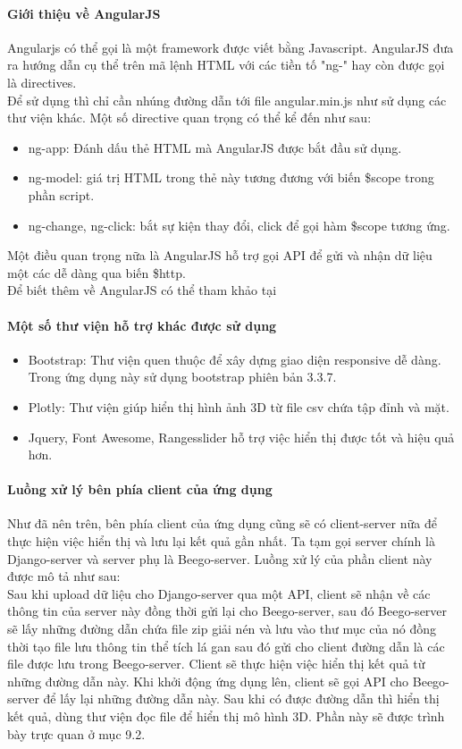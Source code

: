 \paragraph{ Giới thiệu về AngularJS\\}
Angularjs có thể gọi là một framework được viết bằng Javascript. AngularJS đưa ra hướng dẫn cụ thể trên mã lệnh HTML với các tiền tố "ng-" hay còn được gọi là directives.\\
Để sử dụng thì chỉ cần nhúng đường dẫn tới file angular.min.js như sử dụng các thư viện khác.
Một số directive quan trọng có thể kể đến như sau:
\begin{itemize}
    \item ng-app: Đánh dấu thẻ HTML mà AngularJS được bắt đầu sử dụng.
    \item ng-model: giá trị HTML trong thẻ này tương đương với biến \$scope trong phần script.
    \item ng-change, ng-click: bắt sự kiện thay đổi, click để gọi hàm \$scope tương ứng.
\end{itemize}
Một điều quan trọng nữa là AngularJS hỗ trợ gọi API để gửi và nhận dữ liệu một các dễ dàng qua biến \$http.\\
Để biết thêm về AngularJS có thể tham khảo tại 

\paragraph{Một số thư viện hỗ trợ khác được sử dụng\\}
\begin{itemize}
    \item Bootstrap: Thư viện quen thuộc để xây dựng giao diện responsive dễ dàng. Trong ứng dụng này sử dụng bootstrap phiên bản 3.3.7.
    \item Plotly: Thư viện giúp hiển thị hình ảnh 3D từ file csv chứa tập đỉnh và mặt.
    \item Jquery, Font Awesome, Rangesslider hỗ trợ việc hiển thị được tốt và hiệu quả hơn.
\end{itemize}

\paragraph{Luồng xử lý bên phía client của ứng dụng\\}
Như đã nên trên, bên phía client của ứng dụng cũng sẽ có client-server nữa để thực hiện việc hiển thị và lưu lại kết quả gần nhất. Ta tạm gọi server chính là Django-server và server phụ là Beego-server. Luồng xử lý của phần client này được mô tả như sau:\\
Sau khi upload dữ liệu cho Django-server qua một API, client sẽ nhận về các thông tin của server này đồng thời gửi lại cho Beego-server, sau đó Beego-server sẽ lấy những đường dẫn chứa file zip giải nén và lưu vào thư mục của nó đồng thời tạo file lưu thông tin thể tích lá gan sau đó gửi cho client đường dẫn là các file được lưu trong Beego-server. Client sẽ thực hiện việc hiển thị kết quả từ những đường dẫn này. Khi khởi động ứng dụng lên, client sẽ gọi API cho Beego-server để lấy lại những đường dẫn này. Sau khi có được đường dẫn thì hiển thị kết quả, dùng thư viện đọc file để hiển thị mô hình 3D. Phần này sẽ được trình bày trực quan ở mục 9.2.
